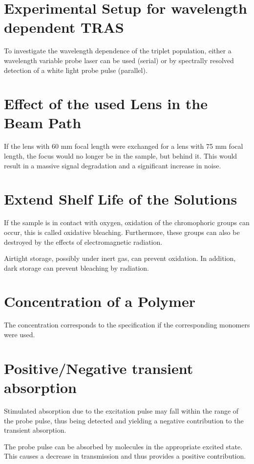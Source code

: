 
\section{Experimental Setup for wavelength dependent TRAS}
\label{sec:setup}
To investigate the wavelength dependence of the triplet population, either a wavelength variable probe laser can be used (serial) or by spectrally resolved detection of a white light probe pulse (parallel).

\section{Effect of the used Lens in the Beam Path}
\label{sec:effect}
If the lens with 60 mm focal length were exchanged for a lens with 75 mm focal length, the focus would no longer be in the sample, but behind it. This would result in a massive signal degradation and a significant increase in noise.

\section{Extend Shelf Life of the Solutions}
\label{sec:lifetime}
If the sample is in contact with oxygen, oxidation of the chromophoric groups can occur, this is called oxidative bleaching. Furthermore, these groups can also be destroyed by the effects of electromagnetic radiation. 

Airtight storage, possibly under inert gas, can prevent oxidation. In addition, dark storage can prevent bleaching by radiation.

\section{Concentration of a Polymer}
\label{sec:concentration}
The concentration corresponds to the specification if the corresponding monomers were used.


\section{Positive/Negative transient absorption}
Stimulated absorption due to the excitation pulse may fall within the range of the probe pulse, thus being detected and yielding a negative contribution to the transient absorption.

The probe pulse can be absorbed by molecules in the appropriate excited state. This causes a decrease in transmission and thus provides a positive contribution.
